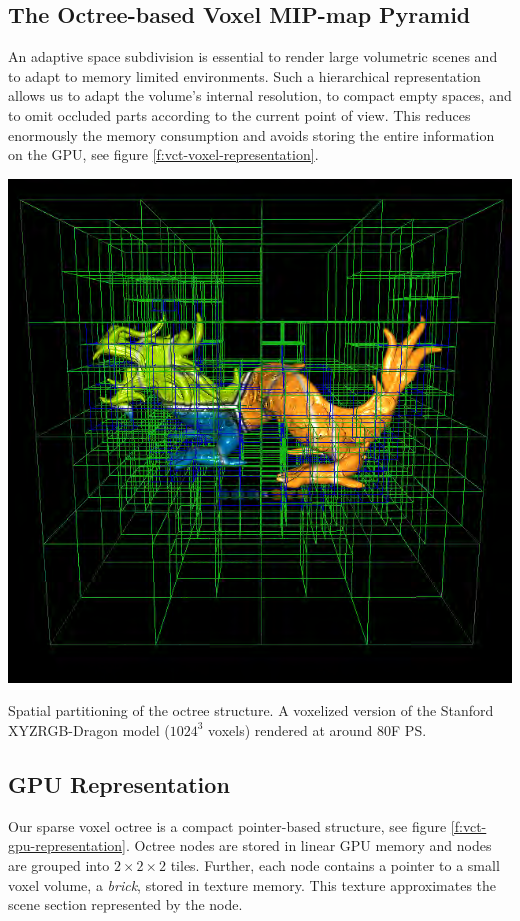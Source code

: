\subsection{The Octree-based Voxel MIP-map Pyramid}
An adaptive space subdivision is essential to render large volumetric scenes and to adapt to memory limited environments. Such a hierarchical representation allows us to adapt the volume's internal resolution, to compact empty spaces, and to omit occluded parts according to the current point of view. This reduces enormously the memory consumption and avoids storing the entire information on the GPU, see figure \ref{f:vct-voxel-representation}.

\begin{marginfigure}
	\includegraphics{graphics/vct/vct-13-1}
	\caption{Spatial partitioning of the octree structure. A voxelized version of the Stanford XYZRGB-Dragon model ($1024^{3}$ voxels) rendered at around 80F PS.}
	\label{f:vct-voxel-representation}
\end{marginfigure}



\subsection{GPU Representation}\label{sec:vct-gpu}
Our sparse voxel octree is a compact pointer-based structure, see figure \ref{f:vct-gpu-representation}. Octree nodes are stored in linear GPU memory and nodes are grouped into $2\times 2\times 2$ tiles. Further, each node contains a pointer to a small voxel volume, a \textit{brick}, stored in texture memory. This texture approximates the scene section represented by the node. 

